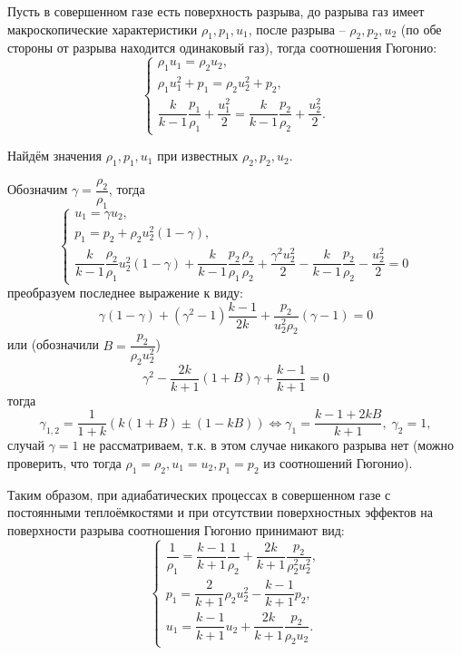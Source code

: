 
Пусть в совершенном газе есть поверхность разрыва, до разрыва газ
имеет макроскопические характеристики $\rho_1, p_1, u_1$, после разрыва -- $\rho_2, p_2, u_2$
(по обе стороны от разрыва находится одинаковый газ),
тогда соотношения Гюгонио:
\[
  \begin{cases}
    \rho_1 u_1 = \rho_2 u_2, \\
    \rho_1 u_1^2 + p_1 = \rho_2 u_2^2 + p_2, \\
    \dfrac{k}{k-1} \dfrac{p_1}{\rho_1} + \dfrac{u_1^2}{2} = \dfrac{k}{k-1} \dfrac{p_2}{\rho_2} + \dfrac{u_2^2}{2}.
  \end{cases}
\]

Найдём значения $\rho_1, p_1, u_1$ при известных $\rho_2, p_2, u_2$.

Обозначим $\gamma = \dfrac{\rho_2}{\rho_1}$, тогда
\[
  \begin{cases}
    u_1 = \gamma u_2, \\
    p_1 = p_2 + \rho_2 u_2^2 (1 - \gamma), \\
    \dfrac{k}{k-1} \dfrac{\rho_2}{\rho_1} u_2^2 (1 - \gamma) + \dfrac{k}{k-1} \dfrac{p_2}{\rho_1} \dfrac{\rho_2}{\rho_2} + \dfrac{\gamma^2 u_2^2}{2} - \dfrac{k}{k-1} \dfrac{p_2}{\rho_2} - \dfrac{u_2^2}{2} = 0
  \end{cases}
\]
преобразуем последнее выражение к виду:
\[
 \gamma(1-\gamma) + (\gamma^2 - 1) \dfrac{k-1}{2k}+ \dfrac{p_2}{u_2^2 \rho_2} (\gamma-1) = 0
\]
или (обозначили $B = \dfrac{p_2}{\rho_2 u_2^2}$)
\[
  \gamma^2 - \dfrac{2k}{k+1} (1 + B) \gamma + \dfrac{k-1}{k+1} = 0
\]
тогда
\[
  \gamma_{1, 2} = \dfrac{1}{1+k} \left( k(1+B) \pm (1 - kB) \right)
  \Leftrightarrow
  \gamma_1 = \dfrac{k-1 +2kB}{k+1}, \; \gamma_2 = 1,
\]
случай $\gamma = 1$ не рассматриваем, т.к. в этом случае никакого разрыва нет (можно проверить,
что тогда $\rho_1=\rho_2, u_1=u_2, p_1=p_2$ из соотношений Гюгонио).

Таким образом, при адиабатических процессах в совершенном газе с постоянными теплоёмкостями
и при отсутствии поверхностных эффектов на поверхности разрыва соотношения Гюгонио принимают вид:
\[
  \begin{cases}
    \dfrac{1}{\rho_1} = \dfrac{k-1}{k+1}\dfrac{1}{\rho_2} + \dfrac{2k}{k+1} \dfrac{p_2}{\rho_2^2 u_2^2}, \\
    p_1 = \dfrac{2}{k+1} \rho_2 u_2^2 - \dfrac{k-1}{k+1} p_2, \\
    u_1 = \dfrac{k-1}{k+1} u_2 + \dfrac{2k}{k+1} \dfrac{p_2}{\rho_2 u_2}.
  \end{cases}
  
\]
